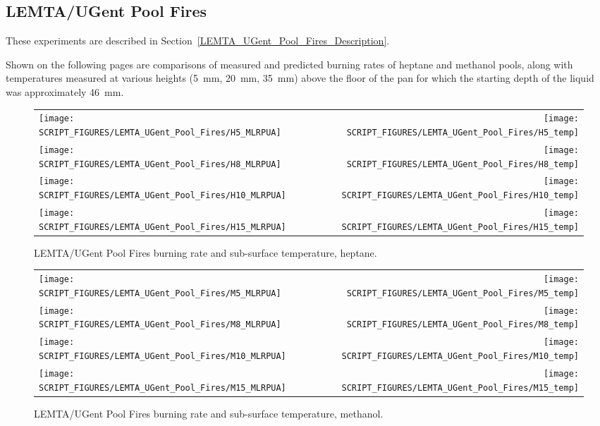 \clearpage

\subsection{LEMTA/UGent Pool Fires}

These experiments are described in Section~\ref{LEMTA_UGent_Pool_Fires_Description}.

Shown on the following pages are comparisons of measured and predicted burning rates of heptane and methanol pools, along with temperatures measured at various heights (5~mm, 20~mm, 35~mm) above the floor of the pan for which the starting depth of the liquid was approximately 46~mm.

\newpage

\begin{figure}[p]
\begin{tabular*}{\textwidth}{l@{\extracolsep{\fill}}r}
\texttt{[image: SCRIPT\_FIGURES/LEMTA\_UGent\_Pool\_Fires/H5\_MLRPUA]} &
\texttt{[image: SCRIPT\_FIGURES/LEMTA\_UGent\_Pool\_Fires/H5\_temp]} \\
\texttt{[image: SCRIPT\_FIGURES/LEMTA\_UGent\_Pool\_Fires/H8\_MLRPUA]} &
\texttt{[image: SCRIPT\_FIGURES/LEMTA\_UGent\_Pool\_Fires/H8\_temp]} \\
\texttt{[image: SCRIPT\_FIGURES/LEMTA\_UGent\_Pool\_Fires/H10\_MLRPUA]} &
\texttt{[image: SCRIPT\_FIGURES/LEMTA\_UGent\_Pool\_Fires/H10\_temp]} \\
\texttt{[image: SCRIPT\_FIGURES/LEMTA\_UGent\_Pool\_Fires/H15\_MLRPUA]} &
\texttt{[image: SCRIPT\_FIGURES/LEMTA\_UGent\_Pool\_Fires/H15\_temp]}
\end{tabular*}
\caption[LEMTA/UGent Pool Fires burning rate and sub-surface temperature, heptane]{LEMTA/UGent Pool Fires burning rate and sub-surface temperature, heptane.}
\label{LEMTA_UGent_heptane}
\end{figure}

\begin{figure}[p]
\begin{tabular*}{\textwidth}{l@{\extracolsep{\fill}}r}
\texttt{[image: SCRIPT\_FIGURES/LEMTA\_UGent\_Pool\_Fires/M5\_MLRPUA]} &
\texttt{[image: SCRIPT\_FIGURES/LEMTA\_UGent\_Pool\_Fires/M5\_temp]} \\
\texttt{[image: SCRIPT\_FIGURES/LEMTA\_UGent\_Pool\_Fires/M8\_MLRPUA]} &
\texttt{[image: SCRIPT\_FIGURES/LEMTA\_UGent\_Pool\_Fires/M8\_temp]} \\
\texttt{[image: SCRIPT\_FIGURES/LEMTA\_UGent\_Pool\_Fires/M10\_MLRPUA]} &
\texttt{[image: SCRIPT\_FIGURES/LEMTA\_UGent\_Pool\_Fires/M10\_temp]} \\
\texttt{[image: SCRIPT\_FIGURES/LEMTA\_UGent\_Pool\_Fires/M15\_MLRPUA]} &
\texttt{[image: SCRIPT\_FIGURES/LEMTA\_UGent\_Pool\_Fires/M15\_temp]}
\end{tabular*}
\caption[LEMTA/UGent Pool Fires burning rate and sub-surface temperature, methanol]{LEMTA/UGent Pool Fires burning rate and sub-surface temperature, methanol.}
\label{LEMTA_UGent_methanol}
\end{figure}


